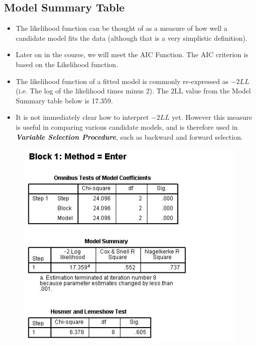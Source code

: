 \documentclass[a4paper,12pt]{article}
\begin{document}
\subsection{Model Summary Table}

\begin{itemize}
	\item The likelihood function can be thought of as a measure of how well a candidate model fits the data (although that is a very simplistic definition). 
	\item Later on in the course, we will meet the AIC Function. The AIC criterion is based on the Likelihood function.
	\item The likelihood function of a fitted model is commonly re-expressed as $-2LL$ (i.e. The log of the likelihood times minus 2). The 2LL value from the Model Summary table below is 17.359.
	\item It is not immediately clear how to interpret $-2LL$ yet. However this measure is useful in comparing various candidate models, and is therefore used in \textbf{\textit{Variable Selection Procedure}}, such as backward and forward selection.
\end{itemize}

\begin{figure}[h!]
	\centering
	\includegraphics[width=0.9\linewidth]{images/Logistic5}
\end{figure}
\end{document}
